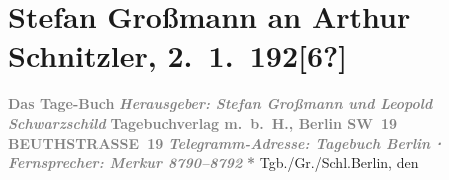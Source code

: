 

         
         \renewcommand{\erwaehntePersonen}{Personen: Leopold Schwarzschild}
         \renewcommand{\erwaehnteInstitutionen}{Institutionen: Das Tage-Buch}
         \renewcommand{\erwaehnteOrte}{Orte: Berlin, Beuthstrasse, Sternwartestraße, Wien, XVIII., Währing}
         \renewcommand{\erwaehnteWerke}{}
               \section[Stefan Großmann an Arthur Schnitzler, 2. 1. 192{[}6?{]}]{ Stefan Großmann an Arthur Schnitzler, 2. 1. 192{[}6?{]}}\nopagebreak{}\rehead{ }\begin{ledgroupsized}[t]{13cm}\normalsize\beginnumbering \toendnotes[C]{\smallbreak\pagebreak[2]} 
\toendnotes[C]{\smallbreak}\pstart
           \noindent{}\centering{}{\pb}\textcolor{gray}{\textbf{Das Tage-Buch}}\pend
           \pstart
           \noindent{}\centering{}\textcolor{gray}{\textbf{\emph{Herausgeber: Stefan Großmann und Leopold Schwarzschild}}}\pend
           \pstart
           \noindent{}\centering{}\textcolor{gray}{\textbf{Tagebuchverlag m. b. H., Berlin SW 19}}\pend
           \pstart
           \noindent{}\centering{}\textcolor{gray}{\textbf{BEUTHSTRASSE 19}}\pend
           \pstart
           \noindent{}\centering{}\textcolor{gray}{\textbf{\emph{Telegramm-Adresse: Tagebuch Berlin ⋅ Fernsprecher: Merkur 8790–8792}}}\pend
           \pstart
           \noindent{}\centering{}\textcolor{gray}{\textbf{\emph{}}}\pend
           \pstart
           \noindent{}\centering{}\textcolor{gray}{\textbf{*}}\pend
           \pstart
           \noindent{}Tgb./Gr./Schl.\hfill Berlin, den \label{K_L02464_1v}
\end{ledgroupsized}

